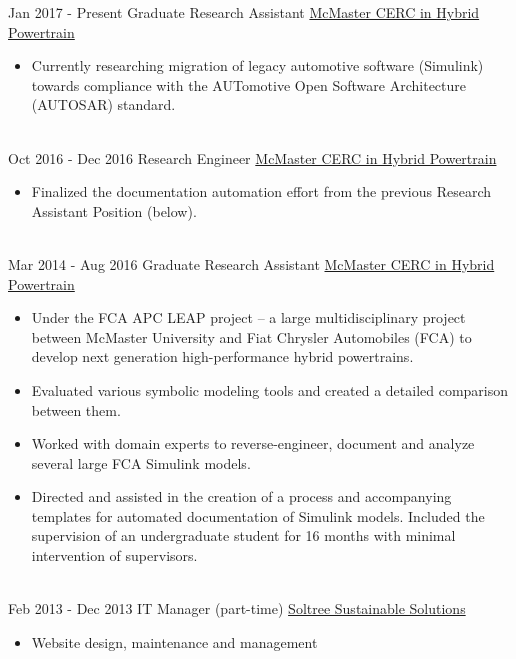 \documentclass[letterpaper]{twentysecondcv} %
\begin{document}
\begin{twenty} %
	\twentyitem
	{Jan 2017 -}
	{Present}
	{Graduate Research Assistant}
	{%
		\href{http://hybrid.mcmaster.ca/}{McMaster CERC in Hybrid Powertrain}}
	{}
	{\begin{itemize}
			\item Currently researching migration of legacy automotive software
			(Simulink) towards compliance with the AUTomotive Open Software 
			Architecture (AUTOSAR) standard.
	\end{itemize}}
	\\
	\twentyitem
	{Oct 2016 -}
	{Dec 2016}
	{Research Engineer}
	{\href{http://hybrid.mcmaster.ca/}{McMaster CERC in Hybrid Powertrain}}
	{}
	{\begin{itemize}
			\item Finalized the documentation automation effort from the previous
			Research Assistant Position (below).
	\end{itemize}}
	\\
	\twentyitem
	{Mar 2014 -}
	{Aug 2016}
	{Graduate Research Assistant}
	{\href{http://hybrid.mcmaster.ca/}{McMaster CERC in Hybrid Powertrain}}
	{}
	{\begin{itemize}
			\item Under the FCA APC LEAP project -- a large multidisciplinary project
			between McMaster University and Fiat Chrysler Automobiles (FCA) to develop
			next generation high-performance hybrid powertrains.
			\item Evaluated various symbolic modeling tools and created a detailed
			comparison between them.
			\item Worked with domain experts to reverse-engineer, document and analyze
			several large FCA Simulink models.
			\item Directed and assisted in the creation of a process and accompanying
			templates for automated documentation of Simulink models. Included the
			supervision of an undergraduate student for 16 months with minimal
			intervention of supervisors.
	\end{itemize}}
	\\
	\twentyitem
	{Feb 2013 -}
	{Dec 2013}
	{IT Manager (part-time)}
	{\href{http://www.soltree.net/}{Soltree Sustainable Solutions}}
	{}
	{\begin{itemize}
			\item Website design, maintenance and management

\end{itemize}}
\end{twenty}
\end{document}
